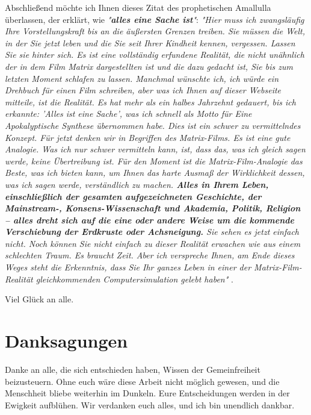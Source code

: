 \documentclass[10pt,twocolumn,letterpaper]{article}
\begin{document}
Abschließend möchte ich Ihnen dieses Zitat des prophetischen Amallulla überlassen, der erklärt, wie \textit{"\textbf{alles eine Sache ist}"}: \textit{"Hier muss ich zwangsläufig Ihre Vorstellungskraft bis an die äußersten Grenzen treiben. Sie müssen die Welt, in der Sie jetzt leben und die Sie seit Ihrer Kindheit kennen, vergessen. Lassen Sie sie hinter sich. Es ist eine vollständig erfundene Realität, die nicht unähnlich der in dem Film Matrix dargestellten ist und die dazu gedacht ist, Sie bis zum letzten Moment schlafen zu lassen. Manchmal wünschte ich, ich würde ein Drehbuch für einen Film schreiben, aber was ich Ihnen auf dieser Webseite mitteile, ist die Realität. Es hat mehr als ein halbes Jahrzehnt gedauert, bis ich erkannte: 'Alles ist eine Sache', was ich schnell als Motto für Eine Apokalyptische Synthese übernommen habe. Dies ist ein schwer zu vermittelndes Konzept. Für jetzt denken wir in Begriffen des Matrix-Films. Es ist eine gute Analogie. Was ich nur schwer vermitteln kann, ist, dass das, was ich gleich sagen werde, keine Übertreibung ist. Für den Moment ist die Matrix-Film-Analogie das Beste, was ich bieten kann, um Ihnen das harte Ausmaß der Wirklichkeit dessen, was ich sagen werde, verständlich zu machen. \textbf{Alles in Ihrem Leben, einschließlich der gesamten aufgezeichneten Geschichte, der Mainstream-, Konsens-Wissenschaft und Akademia, Politik, Religion – alles dreht sich auf die eine oder andere Weise um die kommende Verschiebung der Erdkruste oder Achsneigung.} Sie sehen es jetzt einfach nicht. Noch können Sie nicht einfach zu dieser Realität erwachen wie aus einem schlechten Traum. Es braucht Zeit. Aber ich verspreche Ihnen, am Ende dieses Weges steht die Erkenntnis, dass Sie Ihr ganzes Leben in einer der Matrix-Film-Realität gleichkommenden Computersimulation gelebt haben"} \cite{33,34}.

Viel Glück an alle.

\section{Danksagungen}

Danke an alle, die sich entschieden haben, Wissen der Gemeinfreiheit beizusteuern. Ohne euch wäre diese Arbeit nicht möglich gewesen, und die Menschheit bliebe weiterhin im Dunkeln. Eure Entscheidungen werden in der Ewigkeit aufblühen. Wir verdanken euch alles, und ich bin unendlich dankbar.

\clearpage
\twocolumn

{\small
\renewcommand{\refname}{Quellen}


}
\end{document}

